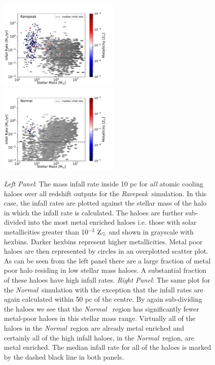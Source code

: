 \documentclass[graphics, twocolumn, usenatbib]{mn2e}
\newcommand{\zsolar} {$\rm{Z_{\odot}}~$}
\newcommand{\rarepeak} {\textit{Rarepeak~}}
\newcommand{\normal} {\textit{Normal~}}
\begin{document}
\begin{figure}
\centering
\begin{minipage}{175mm}      \begin{center} 
\centerline{
\includegraphics[width=0.525\textwidth]{FIGURES/Rarepeak_MdotMstellarZ_Hexbin.pdf}
\includegraphics[width=0.525\textwidth]{FIGURES/Normal_MdotMstellarZ_Hexbin.pdf}}
\caption{\textit{Left Panel}: The mass infall rate inside 10 pc for \textit{all} atomic
  cooling haloes over all redshift outputs for the \rarepeak simulation. In this case,
  the infall rates are plotted against the stellar mass of the halo in which the infall rate is
  calculated. The haloes are further sub-divided into the most metal enriched haloes
  i.e. those with solar metallicities greater than 10$^{-3}$ \zsolar and shown in grayscale with hexbins.
  Darker hexbins represent higher metallicities. Metal poor haloes are then represented by circles in
  an overplotted scatter plot. As can be seen from the left panel there are a large fraction of
  metal poor halo residing in low stellar mass haloes. A substantial fraction of these haloes have
  high infall rates. 
  \textit{Right Panel}: The same plot for the \normal simulation with the exception that the infall rates are 
  again calculated within 50 pc of the centre. By again sub-dividing the haloes we see that the \normal
  region has significantly fewer metal-poor haloes in this stellar mass range. Virtually all of the
  haloes in the \normal region are already metal enriched and certainly all of the high infall haloes,
  in the \normal region, are metal enriched. 
  The median infall rate for all of the haloes is marked by the dashed black line in both panels.} \label{Fig:StellarMass}
\end{center} \end{minipage}

\end{figure}
\end{document}

